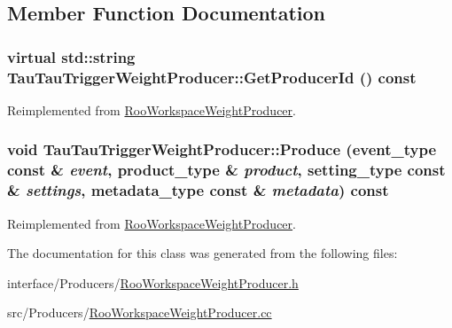 \subsection{Member Function Documentation}
\hypertarget{classTauTauTriggerWeightProducer_adac32370050277ab831ce6db2a957e8d}{
\subsubsection[{GetProducerId}]{\setlength{\rightskip}{0pt plus 5cm}virtual std::string TauTauTriggerWeightProducer::GetProducerId () const}}
\label{classTauTauTriggerWeightProducer_adac32370050277ab831ce6db2a957e8d}


Reimplemented from \hyperlink{classRooWorkspaceWeightProducer_a40f7cc577a5dbf0504fc9f3c1670a0a2}{RooWorkspaceWeightProducer}.\hypertarget{classTauTauTriggerWeightProducer_acea6bd34d07bef650fd48e5535ea0166}{
\subsubsection[{Produce}]{\setlength{\rightskip}{0pt plus 5cm}void TauTauTriggerWeightProducer::Produce (event\_\-type const \& {\em event}, \/  product\_\-type \& {\em product}, \/  setting\_\-type const \& {\em settings}, \/  metadata\_\-type const \& {\em metadata}) const}}
\label{classTauTauTriggerWeightProducer_acea6bd34d07bef650fd48e5535ea0166}


Reimplemented from \hyperlink{classRooWorkspaceWeightProducer_afd139b8380a91e8aaa72066a8a826350}{RooWorkspaceWeightProducer}.

The documentation for this class was generated from the following files:\begin{DoxyCompactItemize}
\item 
interface/Producers/\hyperlink{RooWorkspaceWeightProducer_8h}{RooWorkspaceWeightProducer.h}\item 
src/Producers/\hyperlink{RooWorkspaceWeightProducer_8cc}{RooWorkspaceWeightProducer.cc}\end{DoxyCompactItemize}
